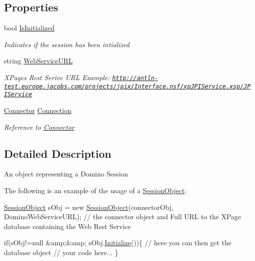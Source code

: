 \subsection*{Properties}
\begin{DoxyCompactItemize}
\item 
bool \mbox{\hyperlink{class_session_object_ae0885b9054fc3ce287307ac16ff69990}{Is\+Initialized}}
\begin{DoxyCompactList}\small\item\em Indicates if the session has been intialized \end{DoxyCompactList}\item 
string \mbox{\hyperlink{class_session_object_a697c071c812fbf7ad1166b896fb44c16}{Web\+Service\+U\+RL}}
\begin{DoxyCompactList}\small\item\em X\+Pages Rest Serive U\+RL Example\+: \href{http://antln-test.europe.jacobs.com/projects/jpix/Interface.nsf/xpJPIService.xsp/JPIService}{\tt http\+://antln-\/test.\+europe.\+jacobs.\+com/projects/jpix/\+Interface.\+nsf/xp\+J\+P\+I\+Service.\+xsp/\+J\+P\+I\+Service} \end{DoxyCompactList}\item 
\mbox{\hyperlink{class_connector}{Connector}} \mbox{\hyperlink{class_session_object_a014bdbf705a753540e19bfb53030c55c}{Connection}}
\begin{DoxyCompactList}\small\item\em Reference to \mbox{\hyperlink{class_connector}{Connector}} \end{DoxyCompactList}\end{DoxyCompactItemize}


\subsection{Detailed Description}
An object representing a Domino Session 

The following is an example of the usage of a {\ttfamily \mbox{\hyperlink{class_session_object}{Session\+Object}}}\+: 
\begin{DoxyCode}
\mbox{\hyperlink{class_session_object}{SessionObject}} sObj = \textcolor{keyword}{new} \mbox{\hyperlink{class_session_object_a173822a7aec467880195d79a1bc9f520}{SessionObject}}(connectorObj, DominoWebServiceURL); \textcolor{comment}{// the
       connector object and Full URL to the XPage database containing the Web Rest Service}

\textcolor{keywordflow}{if}(sObj!=null &amp;&amp; sObj.\mbox{\hyperlink{class_session_object_af3b9c9d56d98c848061952ed935f815b}{Initialize}}())\{
     \textcolor{comment}{// here you can then get the database object}
     \textcolor{comment}{// your code here... }
\}
\end{DoxyCode}
 

